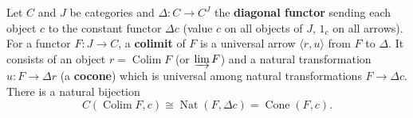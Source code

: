 Let $C$ and $J$ be categories and $\Delta: C \to C^J$ the \textbf{diagonal functor} sending each object $c$ to the constant functor $\Delta c$ (value $c$ on all objects of $J$, $1_c$ on all arrows). For a functor $F: J \to C$, a \textbf{colimit} of $F$ is a universal arrow $\langle r, u \rangle$ from $F$ to $\Delta$. It consists of an object $r = \operatorname{Colim} F$ (or $\varinjlim F$) and a natural transformation $u: F \to \Delta r$ (a \textbf{cocone}) which is universal among natural transformations $F \to \Delta c$. There is a natural bijection
$$C(\operatorname{Colim} F, c) \cong \operatorname{Nat}(F, \Delta c) = \operatorname{Cone}(F, c).$$